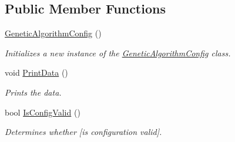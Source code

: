 \subsection*{Public Member Functions}
\begin{DoxyCompactItemize}
\item 
\hyperlink{class_genetic_algorithm_config_a1e36a3e666c730ec44dc232dbf3ee913}{Genetic\+Algorithm\+Config} ()
\begin{DoxyCompactList}\small\item\em Initializes a new instance of the \hyperlink{class_genetic_algorithm_config}{Genetic\+Algorithm\+Config} class. \end{DoxyCompactList}\item 
void \hyperlink{class_genetic_algorithm_config_ad77c035b3b7e5644834ef68aedfaef05}{Print\+Data} ()
\begin{DoxyCompactList}\small\item\em Prints the data. \end{DoxyCompactList}\item 
bool \hyperlink{class_genetic_algorithm_config_ae43b6c714d8d1e6f577dca4a5b9b068f}{Is\+Config\+Valid} ()
\begin{DoxyCompactList}\small\item\em Determines whether \mbox{[}is configuration valid\mbox{]}. \end{DoxyCompactList}\end{DoxyCompactItemize}

